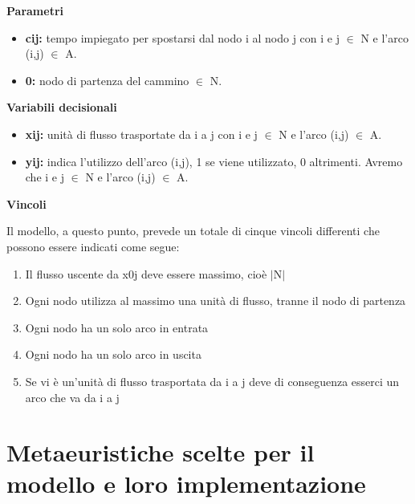 \documentclass[preprint,12pt]{elsarticle}
\begin{document}
\begin{large}
\textbf{Parametri}
\end{large}

\begin{itemize}
\item \textbf{c{\tiny ij}:} tempo impiegato per spostarsi dal nodo i al nodo j con i e j $\in$ N e l'arco (i,j) $\in$ A.
\item \textbf{0:} nodo di partenza del cammino $\in$ N.\\

\end{itemize}


\begin{large}
\textbf{Variabili decisionali}
\end{large}

\begin{itemize}
\item \textbf{x{\tiny ij}:} unità di flusso trasportate da i a j con i e j  $\in$ N e l'arco (i,j) $\in$ A.
\item \textbf{y{\tiny ij}:} indica l'utilizzo dell'arco (i,j), 1 se viene utilizzato, 0 altrimenti. Avremo che i e j  $\in$ N e l'arco (i,j) $\in$ A.\\

\end{itemize}

\begin{large}
\textbf{Vincoli\\}
\end{large}

Il modello, a questo punto, prevede un totale di cinque vincoli differenti che possono essere indicati come segue:


\begin{enumerate}
\item Il flusso uscente da x{\tiny 0j} deve essere massimo, cioè $\mid$N$\mid$
\item Ogni nodo utilizza al massimo una unità di flusso, tranne il nodo di partenza
\item Ogni nodo ha un solo arco in entrata
\item Ogni nodo ha un solo arco in uscita
\item Se vi è un'unità di flusso trasportata da i a j deve di conseguenza esserci un arco che va da i a j
\end{enumerate}

\section{Metaeuristiche scelte per il modello e loro implementazione}
\label{S:2}
\end{document}
